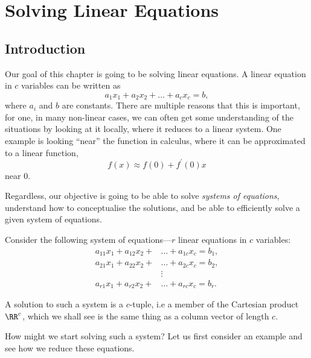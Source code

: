 \chapter{Solving Linear Equations}
\section{Introduction}

Our goal of this chapter is going to be solving linear equations. A linear equation in
$c$ variables can be written as
\[a_1x_1 + a_2x_2 + \dots + a_cx_c = b,\] where $a_i$ and $b$ are constants. There are multiple
reasons that this is important, for one, in many non-linear cases, we can often get
some understanding of the situations by looking at it locally, where it reduces to a
linear system. One example is looking ``near'' the function in calculus, where it can
be approximated to a linear function, \[f(x) \approx f(0) + f^\prime(0)x\]
near $0$.

Regardless, our objective is going to be able to solve \emph{systems of equations}, understand
how to conceptualise the solutions, and be able to efficiently solve a given system of equations.

Consider the following system of equations---$r$ linear equations in $c$ variables:
\begin{equation}
\begin{aligned}
	a_{11}x_1 + a_{12}x_2 + &\dots + a_{1c}x_c = b_1, \\
	a_{21}x_1 + a_{22}x_2 + &\dots + a_{2c}x_c = b_2,\\
	&\vdots \\
	a_{r1}x_1 + a_{r2}x_2 + &\dots + a_{rc}x_c = b_r.
\end{aligned}
\label{eq:systemofeqs}
\end{equation}

A solution to such a system is a $c$-tuple, i.e a member of the Cartesian product $\RR^c$,
which we shall see is the same thing as a column vector of length $c$.

How might we start solving such a system? Let us first consider an example and see how we reduce
these equations.

